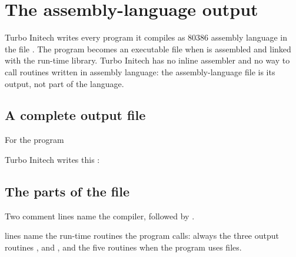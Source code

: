 \chapter{The assembly-language output}

Turbo Initech writes every program it compiles as 80386 assembly language
in the file .  The program becomes an executable file when
 is assembled and linked with the run-time library.  Turbo
Initech has no inline assembler and no way to call routines written in
assembly language: the assembly-language file is its output, not part of
the language.

\section{A complete output file}
For the program


Turbo Initech writes this :



\section{The parts of the file}
Two comment lines name the compiler, followed by
.

 lines name the run-time routines
the program calls: always the three output routines ,
 and , and the five
 routines when the program uses files.

